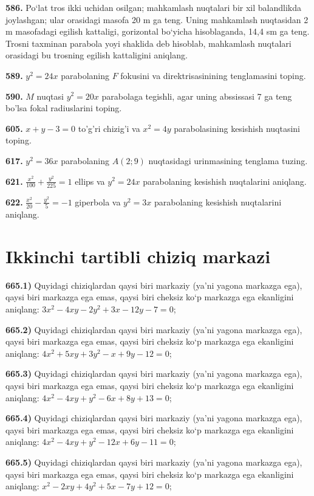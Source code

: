\textbf{586.} Po‘lat tros ikki uchidan osilgan; mahkamlash nuqtalari bir xil balandlikda joylashgan; ular orasidagi masofa 20 m ga teng. Uning mahkamlash nuqtasidan 2 m masofadagi egilish kattaligi, gorizontal bo‘yicha hisoblaganda, 14,4 sm ga teng. Trosni taxminan parabola yoyi shaklida deb hisoblab, mahkamlash nuqtalari orasidagi bu trosning egilish kattaligini aniqlang.

\textbf{589.} $y^2=24 x$ parabolaning $F$ fokusini va direktrisasinining tenglamasini toping.

\textbf{590.} $M$ nuqtasi $y^2=20 x$ parabolaga tegishli, agar uning abssissasi 7 ga teng bo'lsa fokal radiuslarini toping.

\textbf{605.} $x+y-3=0$ to'g'ri chizig'i va $x^2=4 y$ parabolasining kesishish nuqtasini toping.

\textbf{617.} $y^2=36 x$ parabolaning $A(2 ; 9)$ nuqtasidagi urinmasining tenglama tuzing.

\textbf{621.} $\frac{x^2}{100}+\frac{y^2}{225}=1$ ellips va $y^2=24 x$ parabolaning kesishish nuqtalarini aniqlang.

\textbf{622.} $\frac{x^2}{20}-\frac{y^2}{5}=-1$ giperbola va $y^2=3 x$ parabolaning kesishish nuqtalarini aniqlang.


\section{Ikkinchi tartibli chiziq markazi}


\textbf{665.1)} Quyidagi chiziqlardan qaysi biri markaziy (ya’ni yagona markazga ega), qaysi biri markazga ega emas, qaysi biri cheksiz ko‘p markazga ega ekanligini aniqlang: $3 x^2-4 x y-2 y^2+3 x-12 y-7=0$;

\textbf{665.2)} Quyidagi chiziqlardan qaysi biri markaziy (ya’ni yagona markazga ega), qaysi biri markazga ega emas, qaysi biri cheksiz ko‘p markazga ega ekanligini aniqlang: $4 x^2+5 x y+3 y^2-x+9 y-12=0$;

\textbf{665.3)} Quyidagi chiziqlardan qaysi biri markaziy (ya’ni yagona markazga ega), qaysi biri markazga ega emas, qaysi biri cheksiz ko‘p markazga ega ekanligini aniqlang: $4 x^2-4 x y+y^2-6 x+8 y+13=0$;

\textbf{665.4)} Quyidagi chiziqlardan qaysi biri markaziy (ya’ni yagona markazga ega), qaysi biri markazga ega emas, qaysi biri cheksiz ko‘p markazga ega ekanligini aniqlang: $4 x^2-4 x y+y^2-12 x+6 y-11=0$;

\textbf{665.5)} Quyidagi chiziqlardan qaysi biri markaziy (ya’ni yagona markazga ega), qaysi biri markazga ega emas, qaysi biri cheksiz ko‘p markazga ega ekanligini aniqlang: $x^2-2 x y+4 y^2+5 x-7 y+12=0$;

